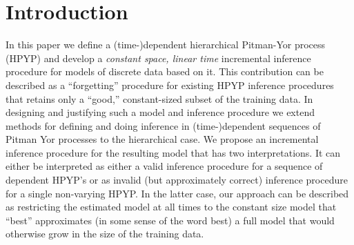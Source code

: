 \section{Introduction}
In this paper we define a  (time-)dependent hierarchical Pitman-Yor process (HPYP) \cite{Teh2006a} and develop a {\em constant space, linear time} incremental inference procedure for models of discrete data based on it.   This contribution can be described as a ``forgetting'' procedure for existing HPYP inference procedures that retains only a ``good,'' constant-sized subset of the training data.  In designing and justifying such a model and inference procedure we extend methods for defining and doing inference in (time-)dependent sequences of Pitman Yor processes \cite{Caron2007, Caron2007a} to the hierarchical case.    We propose an incremental inference procedure for the resulting model that has two interpretations.  It can either be interpreted as either a valid inference procedure for a sequence of dependent HPYP's or as invalid (but approximately correct) inference procedure for a single non-varying HPYP.   In the latter case, our approach can be described as restricting the estimated model at all times  to the constant size model that ``best'' approximates (in some sense of the word best) a full model that would otherwise grow in the size of the training data.   


